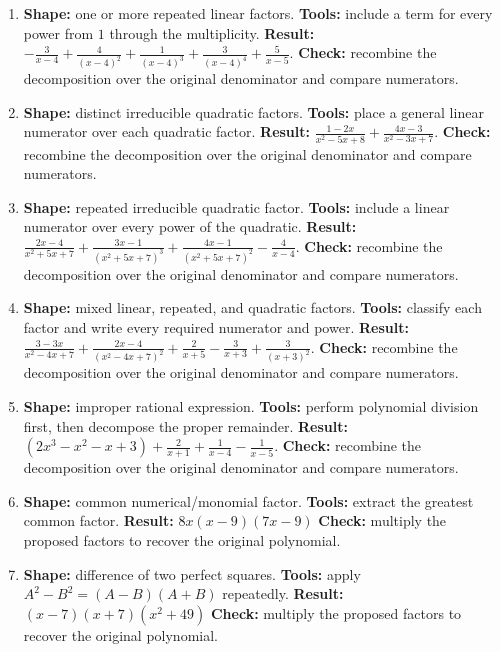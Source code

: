 \documentclass[11pt,oneside]{book}
\begin{document}
\begin{enumerate}[leftmargin=*,label=\textbf{CAP\arabic*.},itemsep=0.45\baselineskip]
\item \textbf{Shape:} one or more repeated linear factors. \textbf{Tools:} include a term for every power from $1$ through the multiplicity. \textbf{Result:} $\displaystyle - \frac{3}{x - 4} + \frac{4}{\left(x - 4\right)^{2}} + \frac{1}{\left(x - 4\right)^{3}} + \frac{3}{\left(x - 4\right)^{4}} + \frac{5}{x - 5}$. \textbf{Check:} recombine the decomposition over the original denominator and compare numerators.
\item \textbf{Shape:} distinct irreducible quadratic factors. \textbf{Tools:} place a general linear numerator over each quadratic factor. \textbf{Result:} $\displaystyle \frac{1 - 2 x}{x^{2} - 5 x + 8} + \frac{4 x - 3}{x^{2} - 3 x + 7}$. \textbf{Check:} recombine the decomposition over the original denominator and compare numerators.
\item \textbf{Shape:} repeated irreducible quadratic factor. \textbf{Tools:} include a linear numerator over every power of the quadratic. \textbf{Result:} $\displaystyle \frac{2 x - 4}{x^{2} + 5 x + 7} + \frac{3 x - 1}{\left(x^{2} + 5 x + 7\right)^{3}} + \frac{4 x - 1}{\left(x^{2} + 5 x + 7\right)^{2}} - \frac{4}{x - 4}$. \textbf{Check:} recombine the decomposition over the original denominator and compare numerators.
\item \textbf{Shape:} mixed linear, repeated, and quadratic factors. \textbf{Tools:} classify each factor and write every required numerator and power. \textbf{Result:} $\displaystyle \frac{3 - 3 x}{x^{2} - 4 x + 7} + \frac{2 x - 4}{\left(x^{2} - 4 x + 7\right)^{2}} + \frac{2}{x + 5} - \frac{3}{x + 3} + \frac{3}{\left(x + 3\right)^{2}}$. \textbf{Check:} recombine the decomposition over the original denominator and compare numerators.
\item \textbf{Shape:} improper rational expression. \textbf{Tools:} perform polynomial division first, then decompose the proper remainder. \textbf{Result:} $\displaystyle \left(2 x^{3} - x^{2} - x + 3\right) + \frac{2}{x + 1} + \frac{1}{x - 4} - \frac{1}{x - 5}$. \textbf{Check:} recombine the decomposition over the original denominator and compare numerators.
\item \textbf{Shape:} common numerical/monomial factor. \textbf{Tools:} extract the greatest common factor. \textbf{Result:} $ 8 x \left(x - 9\right) \left(7 x - 9\right) $ \textbf{Check:} multiply the proposed factors to recover the original polynomial.
\item \textbf{Shape:} difference of two perfect squares. \textbf{Tools:} apply $A^2-B^2=(A-B)(A+B)$ repeatedly. \textbf{Result:} $ \left(x - 7\right) \left(x + 7\right) \left(x^{2} + 49\right) $ \textbf{Check:} multiply the proposed factors to recover the original polynomial.

\end{enumerate}
\end{document}
